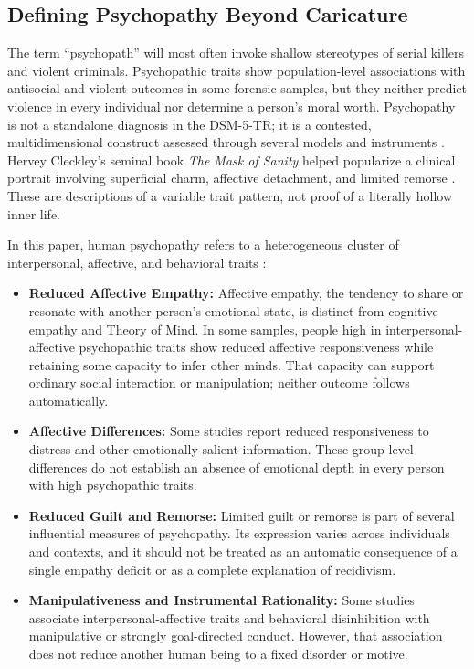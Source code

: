 \documentclass{article}
\begin{document}
\subsection{Defining Psychopathy Beyond Caricature}
The term ``psychopath'' will most often invoke shallow stereotypes of serial killers and violent criminals. Psychopathic traits show population-level associations with antisocial and violent outcomes in some forensic samples, but they neither predict violence in every individual nor determine a person's moral worth. Psychopathy is not a standalone diagnosis in the DSM-5-TR; it is a contested, multidimensional construct assessed through several models and instruments \citep{ref64, ref65}. Hervey Cleckley's seminal book \textit{The Mask of Sanity} helped popularize a clinical portrait involving superficial charm, affective detachment, and limited remorse \citep{ref82, ref64}. These are descriptions of a variable trait pattern, not proof of a literally hollow inner life.

In this paper, human psychopathy refers to a heterogeneous cluster of interpersonal, affective, and behavioral traits \citep{ref50, ref64}:
\begin{itemize}
    \item \textbf{Reduced Affective Empathy:} Affective empathy, the tendency to share or resonate with another person's emotional state, is distinct from cognitive empathy and Theory of Mind. In some samples, people high in interpersonal-affective psychopathic traits show reduced affective responsiveness while retaining some capacity to infer other minds. That capacity can support ordinary social interaction or manipulation; neither outcome follows automatically.
    \item \textbf{Affective Differences:} Some studies report reduced responsiveness to distress and other emotionally salient information. These group-level differences do not establish an absence of emotional depth in every person with high psychopathic traits.
    \item \textbf{Reduced Guilt and Remorse:} Limited guilt or remorse is part of several influential measures of psychopathy. Its expression varies across individuals and contexts, and it should not be treated as an automatic consequence of a single empathy deficit or as a complete explanation of recidivism.
    \item \textbf{Manipulativeness and Instrumental Rationality:} Some studies associate interpersonal-affective traits and behavioral disinhibition with manipulative or strongly goal-directed conduct. However, that association does not reduce another human being to a fixed disorder or motive.
\end{itemize}
\end{document}
